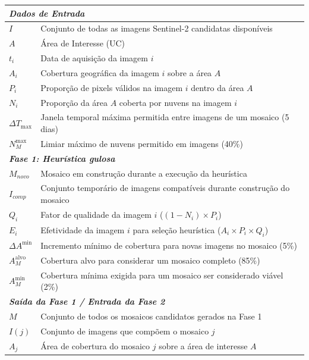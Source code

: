 \documentclass[a4paper,11pt]{article}
\begin{document}
\begin{longtable}{@{ \extracolsep{\fill}}p{2.5cm}p{11.5cm}@{}}
    \multicolumn{2}{l}{\footnotesize\textit{\textbf{Dados de Entrada}}} \\
    \midrule
    $I$        & Conjunto de todas as imagens Sentinel-2 candidatas disponíveis \\
    $A$        & Área de Interesse (UC) \\
    $t_i$      & Data de aquisição da imagem $i$ \\
    $A_i$      & Cobertura geográfica da imagem $i$ sobre a área $A$ \\
    $P_i$      & Proporção de pixels válidos na imagem $i$ dentro da área $A$ \\
    $N_i$      & Proporção da área $A$ coberta por nuvens na imagem $i$ \\
    $\Delta T_{\max}$ & Janela temporal máxima permitida entre imagens de um mosaico (5 dias) \\
    $N_M^{\max}$ & Limiar máximo de nuvens permitido em imagens (40\%) \\[1pt]
    \midrule
    \multicolumn{2}{l}{\footnotesize\textit{\textbf{Fase 1: Heurística gulosa}}} \\
    \midrule
    $M_{novo}$ & Mosaico em construção durante a execução da heurística \\
    $I_{comp}$ & Conjunto temporário de imagens compatíveis durante construção do mosaico \\
    $Q_i$      & Fator de qualidade da imagem $i$ ($(1 - N_i) \times P_i$) \\
    $E_i$      & Efetividade da imagem $i$ para seleção heurística ($A_i \times P_i \times Q_i$) \\
    $\Delta A^{\min}$ & Incremento mínimo de cobertura para novas imagens no mosaico (5\%)\\
    $A_M^{\text{alvo}}$ & Cobertura alvo para considerar um mosaico completo (85\%) \\
    $A_M^{\min}$ & Cobertura mínima exigida para um mosaico ser considerado viável (2\%) \\[1pt]
    \midrule
    \multicolumn{2}{l}{\footnotesize\textit{\textbf{Saída da Fase 1 / Entrada da Fase 2}}} \\
    \midrule
    $M$        & Conjunto de todos os mosaicos candidatos gerados na Fase 1 \\
    $I(j)$     & Conjunto de imagens que compõem o mosaico $j$ \\
    $A_j$      & Área de cobertura do mosaico $j$ sobre a área de interesse $A$ \\

\end{longtable}
\end{document}
